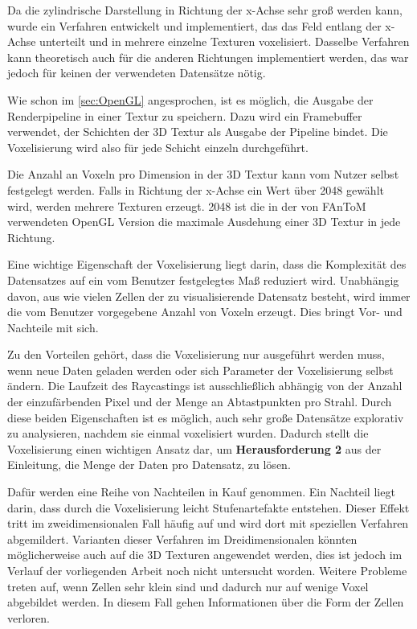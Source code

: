 \documentclass[a4paper,fontsize=12pt,toc=bib,parskip=half,ngerman]{scrartcl}
\begin{document}
Da die zylindrische Darstellung in Richtung der x-Achse sehr gro{\ss} werden kann, wurde ein Verfahren entwickelt und implementiert, das das Feld entlang der x-Achse unterteilt und in mehrere einzelne Texturen voxelisiert. Dasselbe Verfahren kann theoretisch auch f\"ur die anderen Richtungen implementiert werden, das war jedoch f\"ur keinen der verwendeten Datens\"atze n\"otig.

Wie schon im \cref{sec:OpenGL} angesprochen, ist es m\"oglich, die Ausgabe der Renderpipeline in einer Textur zu speichern. Dazu wird ein Framebuffer verwendet, der Schichten der 3D Textur als Ausgabe der Pipeline bindet. Die Voxelisierung wird also f\"ur jede Schicht einzeln durchgef\"uhrt.

Die Anzahl an Voxeln pro Dimension in der 3D Textur kann vom Nutzer selbst festgelegt werden. Falls in Richtung der x-Achse ein Wert \"uber 2048 gew\"ahlt wird, werden mehrere Texturen erzeugt. 2048 ist die in der von FAnToM verwendeten OpenGL Version die maximale Ausdehung einer 3D Textur in jede Richtung.

Eine wichtige Eigenschaft der Voxelisierung liegt darin, dass die Komplexit\"at des Datensatzes auf ein vom Benutzer festgelegtes Ma{\ss} reduziert wird. Unabh\"angig davon, aus wie vielen Zellen der zu visualisierende Datensatz besteht, wird immer die vom Benutzer vorgegebene Anzahl von Voxeln erzeugt. Dies bringt Vor- und Nachteile mit sich.

Zu den Vorteilen geh\"ort, dass die Voxelisierung nur ausgef\"uhrt werden muss, wenn neue Daten geladen werden oder sich Parameter der Voxelisierung selbst \"andern. Die Laufzeit des Raycastings ist ausschlie{\ss}lich abh\"angig von der Anzahl der einzuf\"arbenden Pixel und der Menge an Abtastpunkten pro Strahl. Durch diese beiden Eigenschaften ist es m\"oglich, auch sehr gro{\ss}e Datens\"atze explorativ zu analysieren, nachdem sie einmal voxelisiert wurden. Dadurch stellt die Voxelisierung einen wichtigen Ansatz dar, um \textbf{Herausforderung 2} aus der Einleitung, die Menge der Daten pro Datensatz, zu l\"osen.

Daf\"ur werden eine Reihe von Nachteilen in Kauf genommen. Ein Nachteil liegt darin, dass durch die Voxelisierung leicht Stufenartefakte entstehen. Dieser Effekt tritt im zweidimensionalen Fall h\"aufig auf und wird dort mit speziellen Verfahren abgemildert. Varianten dieser Verfahren im Dreidimensionalen k\"onnten m\"oglicherweise auch auf die 3D Texturen angewendet werden, dies ist jedoch im Verlauf der vorliegenden Arbeit noch nicht untersucht worden. Weitere Probleme treten auf, wenn Zellen sehr klein sind und dadurch nur auf wenige Voxel abgebildet werden. In diesem Fall gehen Informationen \"uber die Form der Zellen verloren.
\end{document}
